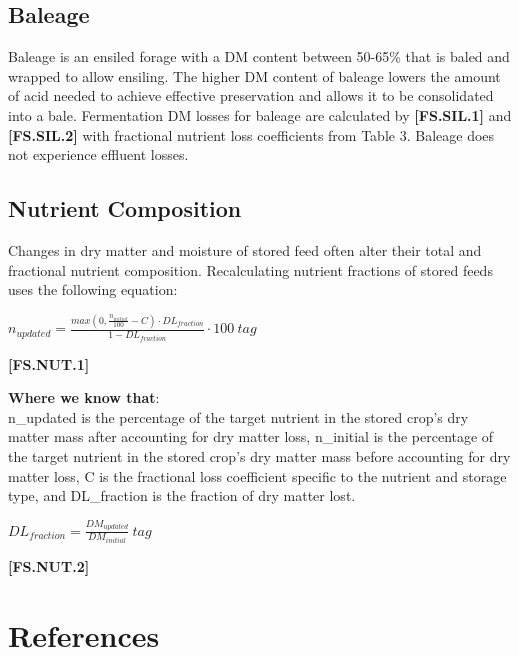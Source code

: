 \begin{refsection}
\subsection{Baleage}
Baleage is an ensiled forage with a DM content between 50-65\% that is baled and wrapped to allow ensiling. The higher DM content of baleage lowers the amount of acid needed to achieve effective preservation and allows it to be consolidated into a bale. Fermentation DM losses for baleage are calculated by \textbf{[FS.SIL.1]} and \textbf{[FS.SIL.2]} with fractional nutrient loss coefficients from Table 3. Baleage does not experience effluent losses.

\subsection{Nutrient Composition}
Changes in dry matter and moisture of stored feed often alter their total and fractional nutrient composition. Recalculating nutrient fractions of stored feeds uses the following equation:
\vspace{0.2cm}

        \begin{center}
        \(n_{updated} = \frac{max(0, \frac{n_{initial}}{100} - C) \cdot DL_{fraction}}{1 - DL_{fraction}} \cdot 100 \ tag\)
    \end{center}
        \vspace{0.5cm}
    
            {\raggedleft \textbf{[FS.NUT.1]}\par}
        \vspace{0.5cm}

\textbf{Where we know that}: \\ n\_updated is the percentage of the target nutrient in the stored crop’s dry matter mass after accounting for dry matter loss, n\_initial is the percentage of the target nutrient in the stored crop’s dry matter mass before accounting for dry matter loss, C is the fractional loss coefficient specific to the nutrient and storage type, and DL\_fraction is the fraction of dry matter lost.
\vspace{0.2cm}

        \begin{center}
        \(DL_{fraction} = \frac{DM_{updated}}{DM_{initial}} \ tag\)
    \end{center}
        \vspace{0.5cm}
    
            {\raggedleft \textbf{[FS.NUT.2]}\par}
        \vspace{0.5cm}







\newpage
\section{References}
\printbibliography[heading=subbibliography,title={Feed Storage Module}]
\end{refsection}
